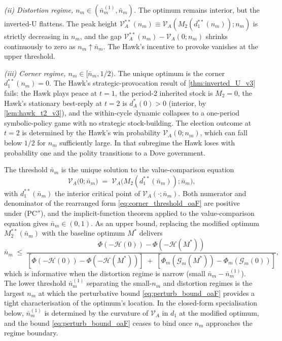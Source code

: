 \documentclass[11pt,twoside]{extarticle}
\begin{document}
\medskip\noindent\textit{(ii) Distortion regime, $n_m\in(\bar n_m^{(1)},\bar n_m)$.} The optimum remains interior, but the inverted-U flattens. The peak height $\mathcal V_A^{**}(n_m)\equiv\mathcal V_A(M_2(d_1^{**}(n_m));n_m)$ is strictly decreasing in $n_m$, and the gap $\mathcal V_A^{**}(n_m)-\mathcal V_A(0;n_m)$ shrinks continuously to zero as $n_m\uparrow\bar n_m$. The Hawk's incentive to provoke vanishes at the upper threshold.

\medskip\noindent\textit{(iii) Corner regime, $n_m\in[\bar n_m,1/2)$.} The unique optimum is the corner $d_1^{**}(n_m)=0$. The Hawk's strategic-provocation result of \autoref{thm:inverted_U_v3} fails: the Hawk plays peace at $t=1$, the period-2 inherited stock is $M_2=0$, the Hawk's stationary best-reply at $t=2$ is $d_A^{*}(0)>0$ (interior, by \autoref{lem:hawk_t2_v3}), and the within-cycle dynamic collapses to a one-period symbolic-policy game with no strategic stock-building. The election outcome at $t=2$ is determined by the Hawk's win probability $\mathcal V_A(0;n_m)$, which can fall below $1/2$ for $n_m$ sufficiently large. In that subregime the Hawk loses with probability one and the polity transitions to a Dove government.

The threshold $\bar n_m$ is the unique solution to the value-comparison equation
\begin{equation}\label{eq:nbar_oaF}
    \mathcal V_A\big(0;\bar n_m\big)\;=\;\mathcal V_A\big(M_2(d_1^{**}(\bar n_m));\bar n_m\big),
\end{equation}
with $d_1^{**}(\bar n_m)$ the interior critical point of $\mathcal V_A(\cdot;\bar n_m)$. Both numerator and denominator of the rearranged form \autoref{eq:corner_threshold_oaF} are positive under (PC$''$), and the implicit-function theorem applied to the value-comparison equation gives $\bar n_m\in(0,1)$. As an upper bound, replacing the modified optimum $M_2^{**}(\bar n_m)$ with the baseline optimum $M^{*}$ delivers
\begin{equation}\label{eq:nbar_upperbound_oaF}
    \bar n_m\;\le\;\frac{\Phi(-\mathcal H(0))-\Phi(-\mathcal H(M^{*}))}{[\Phi(-\mathcal H(0))-\Phi(-\mathcal H(M^{*}))]\;+\;[\Phi_m(\mathcal G_m(M^{*}))-\Phi_m(\mathcal G_m(0))]},
\end{equation}
which is informative when the distortion regime is narrow (small $\bar n_m-\bar n_m^{(1)}$). The lower threshold $\bar n_m^{(1)}$ separating the small-$n_m$ and distortion regimes is the largest $n_m$ at which the perturbative bound \autoref{eq:perturb_bound_oaF} provides a tight characterisation of the optimum's location. In the closed-form specialisation below, $\bar n_m^{(1)}$ is determined by the curvature of $\mathcal V_A$ in $d_1$ at the modified optimum, and the bound \autoref{eq:perturb_bound_oaF} ceases to bind once $n_m$ approaches the regime boundary.
\end{document}
